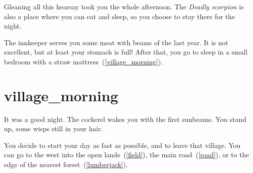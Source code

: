 Gleaning all this hearsay took you the whole afternoon. The \textit{Deadly
scorpion} is also a place where you can eat and sleep, so you choose to stay
there for the night.

The innkeeper serves you some meat with beams of the last year. It is not
excellent, but at least your stomach is full! After that, you go to sleep in a
small bedroom with a straw mattress~(\ref{village_morning}).

\section{village_morning}

It was a good night. The cockerel wakes you with the first sunbeams. You stand
up, some wisps still in your hair.

You decide to start your day as fast as possible, and to leave that village.
You can go to the west into the open lands~(\ref{field}), the main
road~(\ref{road}), or to the edge of the nearest forest~(\ref{lumberjack}).

